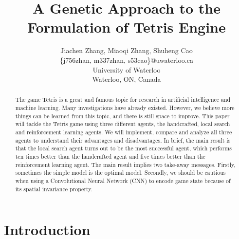 \documentclass[letterpaper]{article} %
\begin{document}
%
\title{A Genetic Approach to the Formulation of Tetris Engine}
\author{Jiachen Zhang, Miaoqi Zhang, Shuheng Cao\\
\{j756zhan, m337zhan, s53cao\}@uwaterloo.ca\\
University of Waterloo\\
Waterloo, ON, Canada\\
}
\maketitle
\newcommand\bi[1]{{\textcolor{black}{#1}}}
\newcommand\blue[1]{\textcolor{blue}{\textbf{#1}}}

\begin{abstract}
  The game Tetris is a great and famous topic for research in artificial intelligence and machine learning. Many investigations have already existed. However, we believe more things can be learned from this topic, and there is still space to improve. This paper will tackle the Tetris game using three different agents, the handcrafted, local search and reinforcement learning agents. We will implement, compare and analyze all three agents to understand their advantages and disadvantages. In brief, the main result is that the local search agent turns out to be the most successful agent, which performs ten times better than the handcrafted agent and five times better than the reinforcement learning agent. The main result implies two take-away messages. Firstly, sometimes the simple model is the optimal model. Secondly, we should be cautious when using a Convolutional Neural Network (CNN) to encode game state because of its spatial invariance property.
\end{abstract}

\section{Introduction} 
\end{document}
